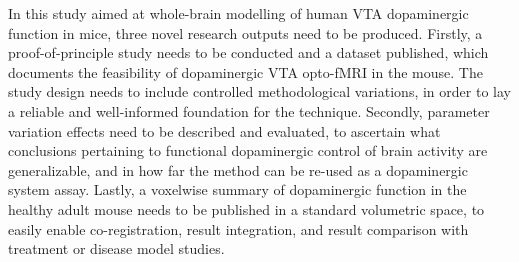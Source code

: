 In this study aimed at whole-brain modelling of human VTA dopaminergic function in mice, three novel research outputs need to be produced.
Firstly, a proof-of-principle study needs to be conducted and a dataset published, which documents the feasibility of dopaminergic VTA opto-fMRI in the mouse.
The study design needs to include controlled methodological variations, in order to lay a reliable and well-informed foundation for the technique.
Secondly, parameter variation effects need to be described and evaluated, to ascertain what conclusions pertaining to functional dopaminergic control of brain activity are generalizable, and in how far the method can be re-used as a dopaminergic system assay.
Lastly, a voxelwise summary of dopaminergic function in the healthy adult mouse needs to be published in a standard volumetric space, to easily enable co-registration, result integration, and result comparison with treatment or disease model studies.
